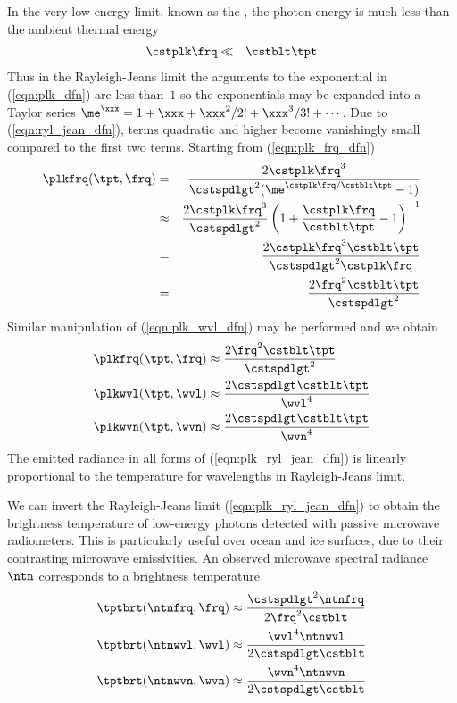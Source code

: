 \documentclass[12pt]{article}
\begin{document}
In the very low energy limit, known as the , the photon energy is much less than the ambient thermal energy 
\begin{eqnarray}
\cstplk \frq & \ll & \cstblt \tpt
\label{eqn:ryl_jean_dfn}
\end{eqnarray}
Thus in the Rayleigh-Jeans limit the arguments to the exponential in
(\ref{eqn:plk_dfn}) are less than~$1$ so the exponentials may be
expanded into a Taylor series
$\me^{\xxx} = 1 + \xxx  + \xxx^{2}/2! + \xxx^{3}/3! + \cdots$.
Due to (\ref{eqn:ryl_jean_dfn}), terms quadratic and higher become
vanishingly small compared to the first two terms.
Starting from (\ref{eqn:plk_frq_dfn}) 
\begin{eqnarray}
\plkfrq(\tpt,\frq) & = & \frac{2 \cstplk \frq^{3}}
       {\cstspdlgt^{2}( \me^{\cstplk \frq / \cstblt \tpt} - 1)}
       \nonumber \\
& \approx & 
\frac{2 \cstplk \frq^{3}}{\cstspdlgt^{2}}
\left(1 + \frac{\cstplk \frq}{\cstblt \tpt} -1 \right)^{-1}
\nonumber \\
& = & 
\frac{2 \cstplk \frq^{3} \cstblt \tpt}{\cstspdlgt^{2} \cstplk \frq}
\nonumber \\
& = & 
\frac{2 \frq^{2} \cstblt \tpt}{\cstspdlgt^{2}}
\end{eqnarray}
Similar manipulation of (\ref{eqn:plk_wvl_dfn}) may be performed 
and we obtain
\begin{subequations}
\label{eqn:plk_ryl_jean_dfn}
\begin{align}
\label{eqn:plk_frq_ryl_jean_dfn}
\plkfrq(\tpt,\frq) & \approx  
\frac{2 \frq^{2} \cstblt \tpt}{\cstspdlgt^{2} } \\
\label{eqn:plk_wvl_ryl_jean_dfn}
\plkwvl(\tpt,\wvl) & \approx  
\frac{2 \cstspdlgt \cstblt \tpt}{\wvl^{4}} \\
\label{eqn:plk_wvn_ryl_jean_dfn}
\plkwvn(\tpt,\wvn) & \approx  
\frac{2 \cstspdlgt \cstblt \tpt}{\wvn^{4}}
\end{align}
\end{subequations}
The emitted radiance in all forms of (\ref{eqn:plk_ryl_jean_dfn}) is linearly proportional to the temperature for 
wavelengths in Rayleigh-Jeans limit.

We can invert the Rayleigh-Jeans limit (\ref{eqn:plk_ryl_jean_dfn}) to obtain
the brightness temperature of low-energy photons detected with passive microwave radiometers.
This is particularly useful over ocean and ice surfaces, due to their contrasting microwave emissivities.
An observed microwave spectral radiance  $\ntn$ corresponds to a brightness temperature
\begin{subequations}
\label{eqn:tpt_brt_ryl_jean_dfn}
\begin{align}
\label{eqn:tpt_frq_ryl_jean_dfn}
\tptbrt(\ntnfrq,\frq) & \approx  
\frac{\cstspdlgt^{2} \ntnfrq}{2 \frq^{2} \cstblt} \\
\label{eqn:tpt_wvl_ryl_jean_dfn}
\tptbrt(\ntnwvl,\wvl) & \approx  
\frac{\wvl^{4} \ntnwvl}{2 \cstspdlgt \cstblt} \\
\label{eqn:tpt_wvn_ryl_jean_dfn}
\tptbrt(\ntnwvn,\wvn) & \approx  
\frac{\wvn^{4} \ntnwvn}{2 \cstspdlgt \cstblt}
\end{align}
\end{subequations}
\end{document}
